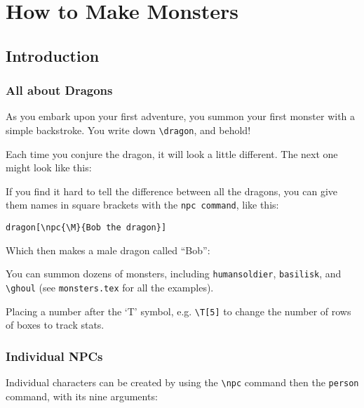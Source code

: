\documentclass[a4paper,openany]{book}
\date{\today}
\begin{document}
\chapter{How to Make Monsters}

\section{Introduction}

\begin{multicols}{2}

\subsection{All about Dragons}

\begin{boxtext}

As you embark upon your first adventure, you summon your first monster with a simple backstroke.
You write down \verb"\dragon", and behold!

\end{boxtext}


Each time you conjure the dragon, it will look a little different.
The next one might look like this:

\dragon

If you find it hard to tell the difference between all the dragons, you can give them names in square brackets with the \verb"npc command", like this:

\verb"dragon[\npc{\M}{Bob the dragon}]"

Which then makes a male dragon called ``Bob'':


You can summon dozens of monsters, including \verb"humansoldier", \verb"basilisk", and \verb"\ghoul"
(see \verb"monsters.tex" for all the examples).

Placing a number after the `T' symbol, e.g. \verb"\T[5]" to change the number of rows of boxes to track stats.


\subsection{Individual NPCs}

Individual characters can be created by using the \verb"\npc" command then the \verb"person" command, with its nine arguments:


\end{multicols}
\end{document}
